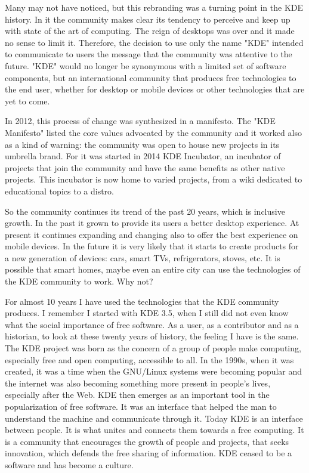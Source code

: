 Many may not have noticed, but this rebranding was a turning point in the KDE history. In it the community makes clear its tendency to perceive and keep up with state of the art of computing. The reign of desktops was over and it made no sense to limit it. Therefore, the decision to use only the name "KDE" intended to communicate to users the message that the community was attentive to the future. "KDE" would no longer be synonymous with a limited set of software components, but an international community that produces free technologies to the end user, whether for desktop or mobile devices or other technologies that are yet to come. 

In 2012, this process of change was synthesized in a manifesto. The "KDE Manifesto" listed the core values advocated by the community and it worked also as a kind of warning: the community was open to house new projects in its umbrella brand. For it was started in 2014 KDE Incubator, an incubator of projects that join the community and have the same benefits as other native projects. This incubator is now home to varied projects, from a wiki dedicated to educational topics to a distro. 

So the community continues its trend of the past 20 years, which is inclusive growth. In the past it grown to provide its users a better desktop experience. At present it continues expanding and changing also to offer the best experience on mobile devices. In the future it is very likely that it starts to create products for a new generation of devices: cars, smart TVs, refrigerators, stoves, etc. It is possible that smart homes, maybe even an entire city can use the technologies of the KDE community to work. Why not? 

For almost 10 years I have used the technologies that the KDE community produces. I remember I started with KDE 3.5, when I still did not even know what the social importance of free software. As a user, as a contributor and as a historian, to look at these twenty years of history, the feeling I have is the same. The KDE project was born as the concern of a group of people make computing, especially free and open computing, accessible to all. In the 1990s, when it was created, it was a time when the GNU/Linux systems were becoming popular and the internet was also becoming something more present in people's lives, especially after the Web. KDE then emerges as an important tool in the popularization of free software. It was an interface that helped the man to understand the machine and communicate through it. Today KDE is an interface between people. It is what unites and connects them towards a free computing. It is a community that encourages the growth of people and projects, that seeks innovation, which defends the free sharing of information. KDE ceased to be a software and has become a culture.
